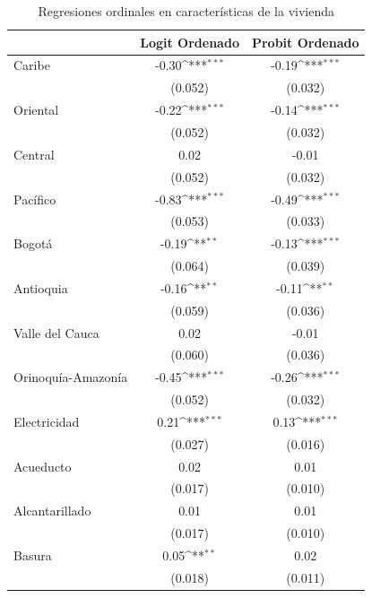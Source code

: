 \documentclass[12pt,spanish]{article}
\begin{document}
\begin{table}[H]
    \centering
    \caption{Regresiones ordinales en características de la vivienda}
    {
\def\sym#1{\ifmmode^{#1}\else\(^{#1}\)\fi}
\begin{tabular}{l*{2}{c}}
\hline\hline
&\multicolumn{1}{c}{Logit Ordenado}&\multicolumn{1}{c}{Probit Ordenado}\\
\hline
Caribe      &       -0.30\sym{***}&       -0.19\sym{***}\\
            &     (0.052)         &     (0.032)         \\
[1em]
Oriental    &       -0.22\sym{***}&       -0.14\sym{***}\\
            &     (0.052)         &     (0.032)         \\
[1em]
Central     &        0.02         &       -0.01         \\
            &     (0.052)         &     (0.032)         \\
[1em]
Pacífico    &       -0.83\sym{***}&       -0.49\sym{***}\\
            &     (0.053)         &     (0.033)         \\
[1em]
Bogotá     &       -0.19\sym{**} &       -0.13\sym{***}\\
            &     (0.064)         &     (0.039)         \\
[1em]
Antioquia   &       -0.16\sym{**} &       -0.11\sym{**} \\
            &     (0.059)         &     (0.036)         \\
[1em]
Valle del Cauca      &        0.02         &       -0.01         \\
            &     (0.060)         &     (0.036)         \\
[1em]
Orinoquía-Amazonía  &       -0.45\sym{***}&       -0.26\sym{***}\\
            &     (0.052)         &     (0.032)         \\
[1em]
Electricidad&        0.21\sym{***}&        0.13\sym{***}\\
            &     (0.027)         &     (0.016)         \\
[1em]
Acueducto   &       0.02         &       0.01         \\
            &     (0.017)         &     (0.010)         \\
[1em]
Alcantarillado&        0.01         &        0.01         \\
            &     (0.017)         &     (0.010)         \\
[1em]
Basura      &        0.05\sym{**} &        0.02         \\
            &     (0.018)         &     (0.011)         \\


\end{tabular}}
\end{table}
\end{document}
